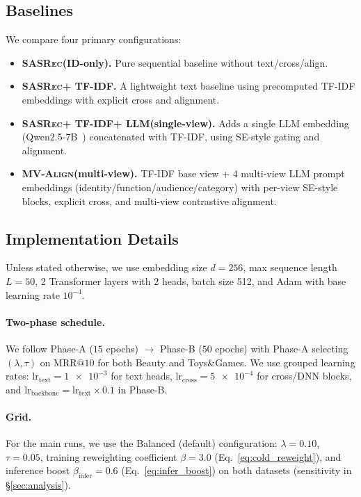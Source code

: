 \documentclass[sigconf,natbib=true,anonymous]{acmart}
\newcommand{\model}{\textsc{MV-Align}\xspace}
\newcommand{\base}{\textsc{SASRec}\xspace}
\newcommand{\tfidf}{\textsc{TF-IDF}\xspace}
\newcommand{\llm}{\textsc{LLM}\xspace}
\begin{document}
\subsection{Baselines}
We compare four primary configurations:
\begin{itemize}[leftmargin=*,itemsep=2pt]
  \item \textbf{\base (ID-only).} Pure sequential baseline
    without text/cross/align.
  \item \textbf{\base + \tfidf.} A lightweight text baseline
    using precomputed \tfidf embeddings with explicit cross
    and alignment.
  \item \textbf{\base + \tfidf + \llm (single-view).} Adds a
    single \llm embedding (Qwen2.5-7B~\cite{qwen2024qwen25}) concatenated with
    \tfidf, using SE-style gating and alignment.
  \item \textbf{\model (multi-view).} \tfidf base view + 4
    multi-view \llm prompt embeddings
    (identity/function/audience/category) with per-view SE-style blocks,
    explicit cross, and multi-view contrastive alignment.
\end{itemize}

\subsection{Implementation Details}
Unless stated otherwise, we use embedding size $d=256$, max
sequence length $L=50$, 2 Transformer layers with 2 heads,
batch size 512, and Adam with base learning rate $10^{-4}$.
\paragraph{Two-phase schedule.}
We follow Phase-A ($15$ epochs) $\rightarrow$ Phase-B ($50$
epochs) with Phase-A selecting $(\lambda,\tau)$ on
$\mathrm{MRR@10}$ for both Beauty and Toys\&Games.
We use grouped learning rates:
$\text{lr}_{\text{text}}=\num{1e-3}$ for text heads,
$\text{lr}_{\text{cross}}=\num{5e-4}$ for cross/DNN blocks,
and $\text{lr}_{\text{backbone}}=\text{lr}_{\text{text}}\times
0.1$ in Phase-B.
\paragraph{Grid.}
For the main runs, we use the Balanced (default) configuration:
$\lambda=0.10$, $\tau=0.05$, training reweighting coefficient
$\beta=3.0$ (Eq.~\eqref{eq:cold_reweight}), and inference boost
$\beta_{\text{infer}}=0.6$ (Eq.~\eqref{eq:infer_boost}) on both datasets
(sensitivity in \S\ref{sec:analysis}).
\end{document}
